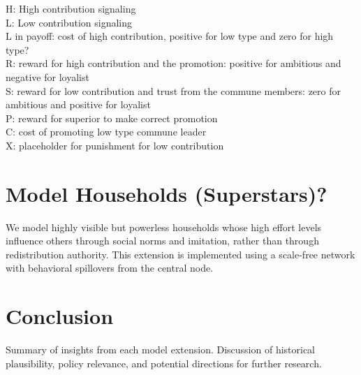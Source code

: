 \documentclass[12pt]{article}
\begin{document}
H: High contribution signaling\\
L: Low contribution signaling\\
L in payoff: cost of high contribution, positive for low type and zero for high type?\\
R: reward for high contribution and the promotion: positive for ambitious and negative for loyalist\\
S: reward for low contribution and trust from the commune members: zero for ambitious and positive for loyalist\\
P: reward for superior to make correct promotion\\
C: cost of promoting low type commune leader\\
X: placeholder for punishment for low contribution\\
\section{Model Households (Superstars)?}
We model highly visible but powerless households whose high effort levels influence others through social norms and imitation, rather than through redistribution authority. This extension is implemented using a scale-free network with behavioral spillovers from the central node.

\section{Conclusion}
Summary of insights from each model extension. Discussion of historical plausibility, policy relevance, and potential directions for further research.

  
\end{document}
